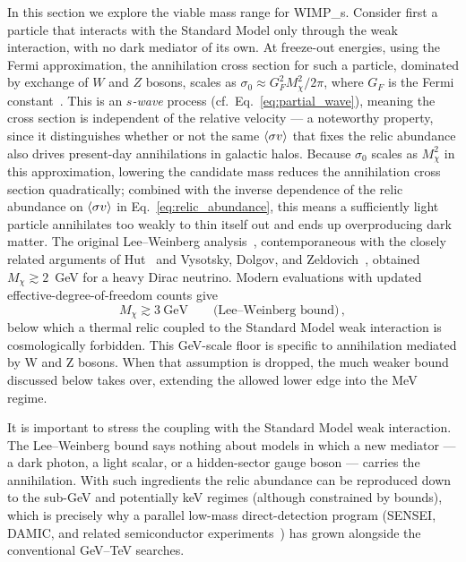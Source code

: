 %
In this section we explore the viable mass range for \glspl{WIMP_}.
Consider first a particle that interacts with the Standard Model only through the weak interaction, with no dark mediator of its own.
At freeze-out energies, using the Fermi approximation, the annihilation cross section for such a particle, dominated by exchange of $W$ and $Z$ bosons, scales as $\sigma_0 \approx G_F^2 M_\chi^2 / 2\pi$, where $G_F$ is the Fermi constant~\cite{Bertone:2004pz}.
This is an \emph{$s$-wave} process (cf.~Eq.~\eqref{eq:partial_wave}), meaning the cross section is independent of the relative velocity --- a noteworthy property, since it distinguishes whether or not the same $\langle \sigma v \rangle$ that fixes the relic abundance also drives present-day annihilations in galactic halos.
Because $\sigma_0$ scales as $M_\chi^2$ in this approximation, lowering the candidate mass reduces the annihilation cross section quadratically; combined with the inverse dependence of the relic abundance on $\langle \sigma v \rangle$ in Eq.~\eqref{eq:relic_abundance}, this means a sufficiently light particle annihilates too weakly to thin itself out and ends up overproducing dark matter.
The original Lee--Weinberg analysis~\cite{Lee:1977ua}, contemporaneous with the closely related arguments of Hut~\cite{Hut:1977zn} and Vysotsky, Dolgov, and Zeldovich~\cite{Vysotsky:1977pe}, obtained $M_\chi \gtrsim 2$~GeV for a heavy Dirac neutrino. Modern evaluations with updated effective-degree-of-freedom counts give~\cite{Cirelli:2024ssz,Bertone:2004pz}
\begin{equation}
	M_\chi \gtrsim 3~\mathrm{GeV} \qquad \text{(Lee--Weinberg bound)}\,,
	\label{eq:lee_weinberg}
\end{equation}
below which a thermal relic coupled to the Standard Model weak interaction is cosmologically forbidden.
This GeV-scale floor is specific to annihilation mediated by W and Z bosons. When that assumption is dropped, the much weaker \BBN bound discussed below takes over, extending the allowed lower edge into the MeV regime.

It is important to stress the coupling with the Standard Model weak interaction.
The Lee--Weinberg bound says nothing about models in which a new mediator --- a dark photon, a light scalar, or a hidden-sector gauge boson --- carries the annihilation.
With such ingredients the relic abundance can be reproduced down to the sub-GeV and potentially keV regimes (although constrained by \BBN bounds), which is precisely why a parallel low-mass direct-detection program (SENSEI, DAMIC, and related semiconductor experiments~\cite{SENSEI:2020dpa,DAMIC-M:2023gxo}) has grown alongside the conventional GeV--TeV searches.

